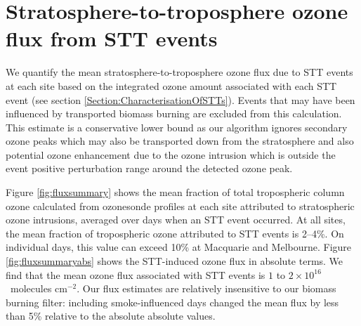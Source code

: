 \documentclass{article}
\begin{document}
\section{Stratosphere-to-troposphere ozone flux from STT events}
  
  We quantify the mean stratosphere-to-troposphere ozone flux due to STT events at each site based on the integrated ozone amount associated with each STT event (see section \ref{Section:CharacterisationOfSTTs}).
  Events that may have been influenced by transported biomass burning are excluded from this calculation.
  This estimate is a conservative lower bound as our algorithm ignores secondary ozone peaks which may also be transported down from the stratosphere and also potential ozone enhancement due to the ozone intrusion which is outside the event positive perturbation range around the detected ozone peak.
  
  Figure \ref{fig:fluxsummary} shows the mean fraction of total tropospheric column ozone calculated from ozonesonde profiles at each site attributed to stratospheric ozone intrusions, averaged over days when an STT event occurred.
  At all sites, the mean fraction of tropospheric ozone attributed to STT events is 2--4\%. On individual days, this value can exceed 10\% at Macquarie and Melbourne.
  Figure \ref{fig:fluxsummaryabs} shows the STT-induced ozone flux in absolute terms.
  We find that the mean ozone flux associated with STT events is $1$ to $2 \times 10^{16}$~molecules cm$^{-2}$.
  Our flux estimates are relatively insensitive to our biomass burning filter: including smoke-influenced days changed the mean flux by less than 5\% relative to the absolute absolute values.
  
\end{document}
